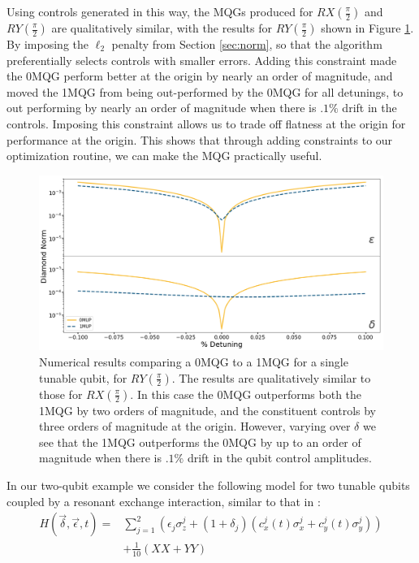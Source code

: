 \documentclass[aps,nofootinbib,pra,notitlepage,twocolumn]{revtex4-1}
\begin{document}
Using controls generated in this way, the MQGs produced for $RX(\frac{\pi}{2})$ and $RY(\frac{\pi}{2})$ are qualitatively similar, with the results for $RY(\frac{\pi}{2})$ shown in Figure \ref{fig:YMQG}. By imposing the $\ell_2$ penalty from Section \ref{sec:norm}, so that the algorithm preferentially selects controls with smaller errors. Adding this constraint made the 0MQG perform better at the origin by nearly an order of magnitude, and moved the 1MQG from being out-performed by the 0MQG for all detunings, to out performing by nearly an order of magnitude when there is $.1\%$ drift in the controls. Imposing this constraint allows us to trade off flatness at the origin for performance at the origin. This shows that through adding constraints to our optimization routine, we can make the MQG practically useful. 

\begin{figure}
  \centering
  \includegraphics[width=\columnwidth]{SQRTY_no_member.png}
  \caption{Numerical results comparing a 0MQG to a 1MQG for a single tunable qubit, for $RY(\frac{\pi}{2})$. The results are qualitatively similar to those for $RX(\frac{\pi}{2})$. In this case the 0MQG outperforms both the 1MQG by two orders of magnitude, and the constituent controls by three orders of magnitude at the origin. However, varying over $\delta$ we see that the 1MQG outperforms the 0MQG by up to an order of magnitude when there is $.1\%$ drift in the qubit control amplitudes.}
  \label{fig:YMQG}
\end{figure}

In our two-qubit example we consider the following model for two tunable qubits coupled by a resonant exchange interaction, similar to that in \cite{McKay2016}:
\begin{equation} \label{eq:2Qham}
\begin{split}
H(\vec{\delta}, \vec{\epsilon}, t) = &\sum_{j=1}^2(\epsilon_j\sigma_z^j + (1 + \delta_j)(c_x^j(t)\sigma_x^j + c_y^j(t)\sigma_y^j)) \\
&+ \frac{1}{10}(XX + YY)
\end{split}
\end{equation}
\end{document}
